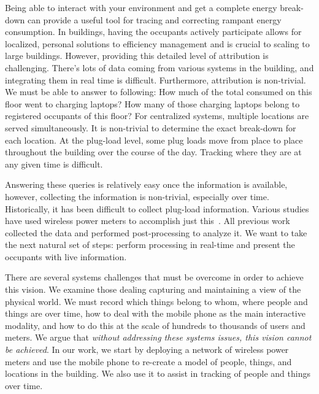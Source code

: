 Being able to interact with your environment and get a complete energy break-down can provide a useful tool
for tracing and correcting rampant energy consumption.  In buildings, having the occupants actively participate
allows for localized, personal solutions to efficiency management and is crucial to scaling to large buildings.
However, providing this detailed level of attribution is challenging.  There's lots of data coming from various systems 
in the building, and integrating them in real time is difficult.  Furthermore, attribution is non-trivial.  
We must be able to answer to following: How much of the total consumed on this floor went to charging laptops?  How
many of those charging laptops belong to registered occupants of this floor?
For centralized systems, multiple locations are served simultaneously.  It is non-trivial to determine the exact
break-down for each location.  At the plug-load level, some plug loads move from place to place throughout the building
over the course of the day.  Tracking where they are at any given time is difficult.

Answering these queries is relatively easy once the information is available, however, collecting the information
is non-trivial, especially over time.  Historically, it has been difficult to collect plug-load information.
Various studies have used wireless power meters to accomplish just this~\cite{stephscale, lanz, aceee}.
All previous work collected the data and performed post-processing to analyze it.  We want to take the next
natural set of steps: perform processing in real-time and present the occupants with live information.  

There are several systems challenges that must be overcome in order to achieve this vision.
We examine those dealing capturing and maintaining a view of the physical world.  We must record which things belong to whom, 
where people
and things are over time, how to deal with the mobile phone as the main interactive modality, and how to do this at the scale of 
hundreds to thousands of users and meters.  We argue that \emph{without addressing these systems issues, this
vision cannot be achieved}.  In our work, we start by deploying a network of wireless power meters and use the mobile
phone to re-create a model of people, things, and locations in the building.  We also use it to assist in tracking of 
people and things over time.

